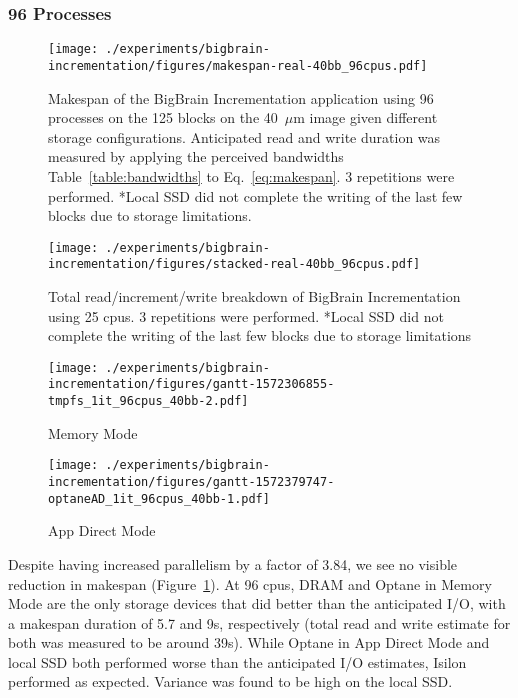 \documentclass[conference]{IEEEtran}
\newcommand{\bigbrain}{BigBrain\xspace}
\begin{document}
\subsubsection{96 Processes}
\begin{figure}
    \texttt{[image: ./experiments/bigbrain-incrementation/figures/makespan-real-40bb\_96cpus.pdf]}
    \captionsetup{belowskip=-10pt}
    \caption{Makespan of the \bigbrain Incrementation application using 96 
             processes on the 125 blocks on the 40~$\mu$m image given different
             storage configurations. Anticipated read and write duration was 
             measured by applying the perceived bandwidths Table~\ref{table:bandwidths}
             to Eq.~\ref{eq:makespan}. 3 
             repetitions were performed. *Local SSD did not complete the
    writing of the last few blocks due to storage limitations.}\label{fig:makespan-96cpus}
\end{figure}
\begin{figure}
    \texttt{[image: ./experiments/bigbrain-incrementation/figures/stacked-real-40bb\_96cpus.pdf]}
    \captionsetup{belowskip=-10pt}
    \caption{Total read/increment/write breakdown of \bigbrain Incrementation using 25 cpus. 3 repetitions were performed. *Local SSD did not
             complete the writing of the last few blocks due to storage limitations}\label{fig:stacked-96cpus}
\end{figure}

\begin{figure*}
    \begin{subfigure}{\columnwidth}
        \centering
    \texttt{[image: ./experiments/bigbrain-incrementation/figures/gantt-1572306855-tmpfs\_1it\_96cpus\_40bb-2.pdf]}
    \caption{Memory Mode}
\end{subfigure}
\begin{subfigure}{\columnwidth}
        \centering
    \texttt{[image: ./experiments/bigbrain-incrementation/figures/gantt-1572379747-optaneAD\_1it\_96cpus\_40bb-1.pdf]}
    \caption{App Direct Mode}
\end{subfigure}
    \captionsetup{belowskip=-10pt}
\caption{Gantt charts for Optane processing 125 blocks of the 40$\mu$m BigBrain using 96 processes}\label{fig:gantt96}
\end{figure*}

Despite having increased parallelism by a factor of 3.84, we see no visible reduction
in makespan (Figure~\ref{fig:makespan-96cpus}). At 96 cpus, DRAM and Optane in Memory Mode are the only storage
devices that did better than the anticipated I/O, with a makespan duration of
5.7 and 9s, respectively (total read and write estimate for both was measured to be around 39s). While
Optane in App Direct Mode and local SSD both performed worse than the anticipated I/O estimates, Isilon
performed as expected. Variance was found to be high on the local SSD.
\end{document}

